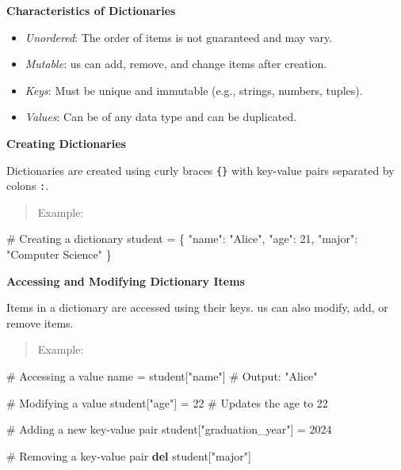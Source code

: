 \documentclass[
  letterpaper,
  DIV=11,
  numbers=noendperiod]{scrreprt}
\newenvironment{Shaded}{\begin{snugshade}}{\end{snugshade}}
\newcommand{\CommentTok}[1]{\textcolor[rgb]{0.37,0.37,0.37}{#1}}
\newcommand{\DecValTok}[1]{\textcolor[rgb]{0.68,0.00,0.00}{#1}}
\newcommand{\KeywordTok}[1]{\textcolor[rgb]{0.00,0.23,0.31}{\textbf{#1}}}
\newcommand{\NormalTok}[1]{\textcolor[rgb]{0.00,0.23,0.31}{#1}}
\newcommand{\OperatorTok}[1]{\textcolor[rgb]{0.37,0.37,0.37}{#1}}
\newcommand{\StringTok}[1]{\textcolor[rgb]{0.13,0.47,0.30}{#1}}
\providecommand{\tightlist}{%
  \setlength{\itemsep}{0pt}\setlength{\parskip}{0pt}}\usepackage{longtable,booktabs,array}
\theoremstyle{plain}
\theoremstyle{definition}
\theoremstyle{remark}
\begin{document}
\textbf{Characteristics of Dictionaries}

\begin{itemize}
\tightlist
\item
  \emph{Unordered}: The order of items is not guaranteed and may vary.
\item
  \emph{Mutable}: us can add, remove, and change items after creation.
\item
  \emph{Keys}: Must be unique and immutable (e.g., strings, numbers,
  tuples).
\item
  \emph{Values}: Can be of any data type and can be duplicated.
\end{itemize}

\textbf{Creating Dictionaries}

Dictionaries are created using curly braces \texttt{\{\}} with key-value
pairs separated by colons \texttt{:}.

\begin{quote}
Example:
\end{quote}

\begin{Shaded}
\begin{Highlighting}[]
\CommentTok{\# Creating a dictionary}
\NormalTok{student }\OperatorTok{=}\NormalTok{ \{}
    \StringTok{"name"}\NormalTok{: }\StringTok{"Alice"}\NormalTok{,}
    \StringTok{"age"}\NormalTok{: }\DecValTok{21}\NormalTok{,}
    \StringTok{"major"}\NormalTok{: }\StringTok{"Computer Science"}
\NormalTok{\}}
\end{Highlighting}
\end{Shaded}

\textbf{Accessing and Modifying Dictionary Items}

Items in a dictionary are accessed using their keys. us can also modify,
add, or remove items.

\begin{quote}
Example:
\end{quote}

\begin{Shaded}
\begin{Highlighting}[]
\CommentTok{\# Accessing a value}
\NormalTok{name }\OperatorTok{=}\NormalTok{ student[}\StringTok{"name"}\NormalTok{]  }\CommentTok{\# Output: "Alice"}

\CommentTok{\# Modifying a value}
\NormalTok{student[}\StringTok{"age"}\NormalTok{] }\OperatorTok{=} \DecValTok{22}  \CommentTok{\# Updates the age to 22}

\CommentTok{\# Adding a new key{-}value pair}
\NormalTok{student[}\StringTok{"graduation\_year"}\NormalTok{] }\OperatorTok{=} \DecValTok{2024}

\CommentTok{\# Removing a key{-}value pair}
\KeywordTok{del}\NormalTok{ student[}\StringTok{"major"}\NormalTok{]}
\end{Highlighting}
\end{Shaded}
\end{document}
